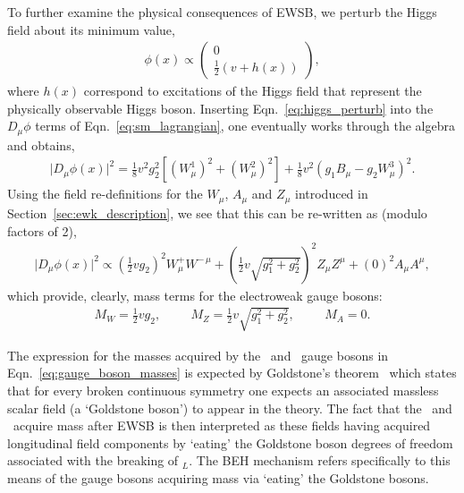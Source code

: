 To further examine the physical consequences of EWSB,
we perturb the Higgs field about its minimum value,
\begin{align}
	\phi(x) \propto \left( \begin{matrix} 0 \\ \frac{1}{2}(v + h(x)) \end{matrix} \right),
	\label{eq:higgs_perturb}
\end{align}
where $h(x)$ correspond to excitations of the Higgs field that represent the physically observable
Higgs boson.
Inserting Eqn.~\ref{eq:higgs_perturb} into the $\mathit{D}_{\mu}\phi$ terms
of Eqn.~\ref{eq:sm_lagrangian}, one eventually works through the algebra and obtains,
\begin{align}
	\lvert\mathit{D}_{\mu} \phi(x)\rvert^2 = \frac{1}{8} v^2 g_2^2 \left[ \left( W^1_{\mu} \right)^2 +\left( W^2_{\mu} \right)^2 \right] 
		+ \frac{1}{8} v^2 \left( g_1 B_{\mu} - g_2 W_{\mu}^3 \right)^2.
	\label{eq:higgs_gauge_expand} 
\end{align}
Using the field re-definitions for the $W_{\mu}$, $A_{\mu}$ and $Z_{\mu}$ introduced in Section~\ref{sec:ewk_description}, we see that this can be re-written as (modulo factors of 2),
\begin{align}
	\lvert\mathit{D}_{\mu} \phi(x)\rvert^2 \propto \left(\frac{1}{2} v g_2 \right)^2 W_{\mu}^+ W^{-\,\mu} + \left( \frac{1}{2}v \sqrt{g_1^2 + g_2^2} \right)^2 Z_{\mu} Z^{\mu} + (0)^2 A_{\mu} A^{\mu},
	\label{eq:higgs_gauge_masses}
\end{align}
which provide, clearly, mass terms for the electroweak gauge bosons:
\begin{align}
	M_W = \frac{1}{2}v g_2, \hspace{1cm} M_Z = \frac{1}{2}v\sqrt{g_1^2 + g_2^2}, \hspace{1cm} M_A = 0.
	\label{eq:gauge_boson_masses}
\end{align}


The expression for the masses acquired by the \fieldWpm~and \fieldZ~gauge bosons in Eqn.~\ref{eq:gauge_boson_masses} is expected by Goldstone's theorem~\cite{Goldstone:1962es} which
states that for every broken continuous symmetry one expects an associated massless
scalar field (a `Goldstone boson') to appear in the theory. The fact that the \fieldWpm~and \fieldZ~acquire
mass after EWSB is then interpreted as these fields having acquired longitudinal field
components by `eating' the Goldstone boson degrees of freedom associated with the
breaking of \SUtwo$_L$. The BEH mechanism refers specifically to this means of the gauge
bosons acquiring mass via `eating' the Goldstone bosons.

